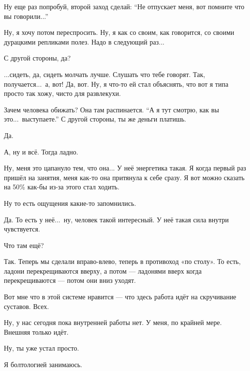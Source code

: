 \M
Ну еще раз попробуй, второй заход сделай:
``Не отпускает меня, вот помните что вы говорили...''

\I
Ну, я хочу потом переспросить. Ну, я как со своим,
как говорится, со своими дурацкими
репликами полез.
Надо в следующий раз...

\M
С другой стороны, да?

\I
...сидеть, да, сидеть молчать лучше. Слушать что тебе говорят. Так,
получается...\ а, вот! Да, вот.
Ну, я что-то ей стал объяснять, что вот я типа просто так хожу, чисто для развлекухи.

\M
Зачем человека обижать? Она там распинается.
``А я тут смотрю, как вы это...\ выступаете.''
С другой стороны, ты же деньги платишь.

\I
Да.

\M
А, ну и всё. Тогда ладно.

\I
Ну, меня это цапануло тем, что она... У неё
энергетика такая. Я когда первый раз пришёл на занятия, меня как-то она притянула к себе сразу.
Я вот можно сказать на 50\% как-бы из-за этого стал ходить.

\M
Ну то есть ощущения какие-то запомнились.

\I
Да. То есть у неё...\ ну, человек такой интересный. У неё такая сила внутри чувствуется.

\M
Что там ещё?

\I
Так. Теперь мы сделали вправо-влево, теперь в противоход «по столу».
То есть, ладони перекрещиваются вверху,
а потом --- ладонями вверх когда перекрещиваются --- потом они вниз уходят.

\M
Вот мне что в этой системе нравится --- что здесь работа идёт на скручивание суставов.
Всех.

\I
Ну, у нас сегодня пока внутренней работы нет. У меня, по крайней мере. Внешняя только идёт.

\M
Ну, ты уже устал просто.

\I
Я болтологией занимаюсь.

